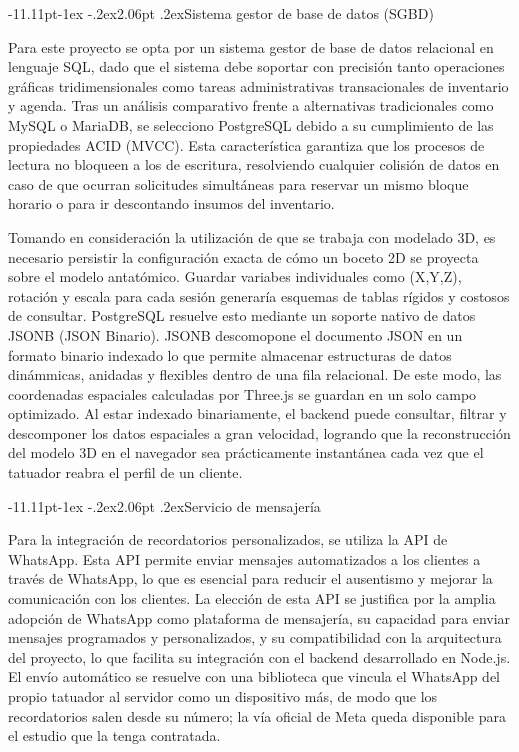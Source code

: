 \documentclass[12pt,letterpaper,oneside]{report}
\makeatletter
\renewcommand\subsection{\@startsection{subsection}{2}{\z@}%
  {-11.11pt\@plus -1ex \@minus -.2ex}{2.06pt \@plus .2ex}{\normalfont\normalsize\bfseries}}
\makeatother
\begin{document}
\subsection{Sistema gestor de base de datos (SGBD) }

Para este proyecto se opta por un sistema gestor de base de datos relacional en lenguaje SQL\cite{iso9075}, dado que el sistema debe soportar con precisión tanto operaciones gráficas tridimensionales como tareas administrativas transacionales de inventario y agenda. Tras un análisis comparativo frente a alternativas tradicionales como MySQL\cite{mysql} o MariaDB\cite{mariadb}, se selecciono PostgreSQL\cite{postgresql} debido a su cumplimiento de las propiedades ACID (MVCC)\cite{harder1983}. Esta característica garantiza que los procesos de lectura no bloqueen a los de escritura, resolviendo cualquier colisión de datos en caso de que ocurran solicitudes simultáneas para reservar un mismo bloque horario o para ir descontando insumos del inventario.

Tomando en consideración la utilización de que se trabaja con modelado 3D, es necesario persistir la configuración exacta de cómo un boceto 2D se proyecta sobre el modelo antatómico. Guardar variabes individuales como (X,Y,Z), rotación y escala para cada sesión generaría esquemas de tablas rígidos y costosos de consultar. PostgreSQL resuelve esto mediante un soporte nativo de datos JSONB (JSON Binario)\cite{postgresjson}. JSONB descomopone el documento JSON\cite{bray2017} en un formato binario indexado lo que permite almacenar estructuras de datos dinámmicas, anidadas y flexibles dentro de una fila relacional. De este modo, las coordenadas espaciales calculadas por Three.js se guardan en un solo campo optimizado. Al estar indexado binariamente, el backend puede consultar, filtrar y descomponer los datos espaciales a gran velocidad, logrando que la reconstrucción del modelo 3D en el navegador sea prácticamente instantánea cada vez que el tatuador reabra el perfil de un cliente.

\subsection{Servicio de mensajería}

Para la integración de recordatorios personalizados, se utiliza la API de WhatsApp. Esta API permite enviar mensajes automatizados a los clientes a través de WhatsApp, lo que es esencial para reducir el ausentismo y mejorar la comunicación con los clientes. La elección de esta API se justifica por la amplia adopción de WhatsApp como plataforma de mensajería, su capacidad para enviar mensajes programados y personalizados, y su compatibilidad con la arquitectura del proyecto, lo que facilita su integración con el backend desarrollado en Node.js. El envío automático se resuelve con una biblioteca que vincula el WhatsApp del propio tatuador al servidor como un dispositivo más\cite{baileys}, de modo que los recordatorios salen desde su número; la vía oficial de Meta queda disponible para el estudio que la tenga contratada.
\end{document}
